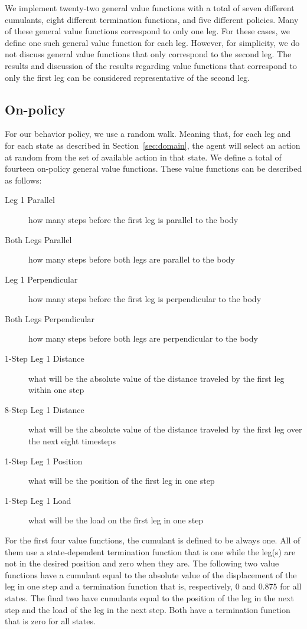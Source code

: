 \documentclass[../main.tex]{subfiles}
\begin{document}
We implement twenty-two general value functions with a total of seven different cumulants, eight different termination functions, and five different policies. Many of these general value functions correspond to only one leg. For these cases, we define one such general value function for each leg. However, for simplicity, we do not discuss general value functions that only correspond to the second leg. The results and discussion of the results regarding value functions that correspond to only the first leg can be considered representative of the second leg.

\subsection{On-policy}
\label{sec:on-policy}

For our behavior policy, we use a random walk. Meaning that, for each leg and for each state as described in Section~\ref{sec:domain}, the agent will select an action at random from the set of available action in that state. We define a total of fourteen on-policy general value functions. These value functions can be described as follows:

\begin{description}
    \item[Leg 1 Parallel] how many steps before the first leg is parallel to the body
    \item[Both Legs Parallel] how many steps before both legs are parallel to the body
    \item[Leg 1 Perpendicular] how many steps before the first leg is perpendicular to the body
    \item[Both Legs Perpendicular] how many steps before both legs are perpendicular to the body
    \item[1-Step Leg 1 Distance] what will be the absolute value of the distance traveled by the first leg within one step
    \item[8-Step Leg 1 Distance] what will be the absolute value of the distance traveled by the first leg over the next eight timesteps
    \item[1-Step Leg 1 Position] what will be the position of the first leg in one step
    \item[1-Step Leg 1 Load] what will be the load on the first leg in one step
\end{description}

For the first four value functions, the cumulant is defined to be always one. All of them use a state-dependent termination function that is one while the leg(s) are not in the desired position and zero when they are. The following two value functions have a cumulant equal to the absolute value of the displacement of the leg in one step and a termination function that is, respectively, $0$ and $0.875$ for all states. The final two have cumulants equal to the position of the leg in the next step and the load of the leg in the next step. Both have a termination function that is zero for all states.
\end{document}
